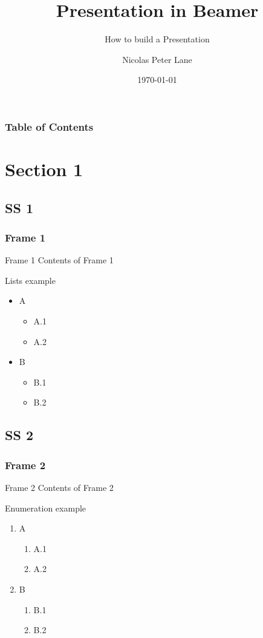 \documentclass[12pt]{beamer}
\title{Presentation in Beamer}
\subtitle{How to build a Presentation}
\author{Nicolas Peter Lane}
\institute{Universidade Estadual de Santa Catarina}
\date{\today}
\begin{document}
\begin{frame}[shrink]
\titlepage
\end{frame}

\begin{frame}
\frametitle{Table of Contents}
\tableofcontents
\end{frame}

\section{Section 1}
\subsection{SS 1}
\begin{frame}[shrink]
\frametitle{Frame 1}
\begin{block}{Frame 1}
\pause
Contents of Frame 1

Lists example
\begin{itemize}
\item{A}
\begin{itemize}
\item{A.1}
\item{A.2}
\end{itemize}
\item{B}
\begin{itemize}
\item{B.1}
\item{B.2}
\end{itemize}
\end{itemize}

\end{block}
\end{frame}

\subsection{SS 2}
\begin{frame}[shrink]
\frametitle{Frame 2}
\begin{block}{Frame 2}
\pause
Contents of Frame 2

Enumeration example
\begin{enumerate}
\item{A}
\begin{enumerate}
\item{A.1}
\item{A.2}
\end{enumerate}
\item{B}
\begin{enumerate}
\item{B.1}
\item{B.2}
\end{enumerate}
\end{enumerate}

\end{block}
\end{frame}
\end{document}
